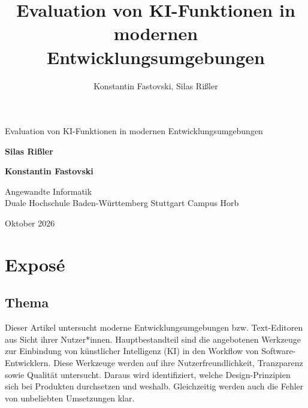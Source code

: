 \documentclass[ngerman]{article}
\begin{document}
\title{Evaluation von KI-Funktionen in modernen Entwicklungsumgebungen}
\author{Konstantin Fastovski, Silas Rißler}
\begin{titlepage}
    \begin{center}
        \vspace{1cm}

        \Huge
        Evaluation von KI-Funktionen in modernen Entwicklungsumgebungen

        \LARGE
        \vspace{1.5cm}
        \textbf{Silas Rißler}

        \textbf{Konstantin Fastovski}

        \vfill

        \Large
        Angewandte Informatik \\
        Duale Hochschule Baden-Württemberg Stuttgart Campus Horb \\
        \vspace{1.5cm}

        Oktober 2026

        \vspace{1cm}
    \end{center}
\end{titlepage}

\newpage

\section{Exposé}
    \subsection{Thema}
    Dieser Artikel untersucht moderne Entwicklungsumgebungen bzw. Text-Editoren aus Sicht ihrer Nutzer*innen. Hauptbestandteil sind die angebotenen Werkzeuge zur Einbindung von künstlicher Intelligenz (KI) in den Workflow von Software-Entwicklern. Diese Werkzeuge werden auf ihre Nutzerfreundlichkeit, Tranzparenz sowie Qualität untersucht. Daraus wird identifiziert, welche Design-Prinzipien sich bei Produkten durchsetzen und weshalb. Gleichzeitig werden auch die Fehler von unbeliebten Umsetzungen klar.
\end{document}
